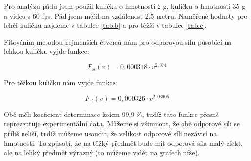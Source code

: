 \documentclass{fkssolpub}
\author{Ondřej Sedláček}
\begin{document}
 

Pro analýzu pádu jsem použil kuličku o hmotnosti 2 g, kuličku o hmotnosti
35 g a video s 60 fps. Pád jsem měřil na vzdálenost 2,5 metru. Naměřené
hodnoty pro lehčí kuličku najdeme v tabulce \ref{tab:b} a pro těžší v
tabulce \ref{tab:c}.

Fitováním metodou nejmenších čtverců nám pro odporovou sílu působící
na lehkou kuličku vyjde funkce:

\[
	F_{ol}(v) = 0{,}000318 \cdot v^{2{,}074}
\]

Pro těžkou kuličku nám vyjde funkce:

\[
	F_{ot}(v) = 0{,}000326 \cdot v^{2{,}03905}
\]

Obě měli koeficient determinace kolem 99{,}9 \%, tudíž tato funkce
přesně reprezentuje experimentální data. Můžeme si všimnout, že obě
odporové síli se příliš neliší, tudíž můžeme usoudit, že velikost
odporové síli nezávisí na hmotnosti. To způsobí, že na těžký předmět
bude mít odporová síla malý efekt, ale na lehký předmět výrazný (to
můžeme vidět na grafech níže).
\end{document}
